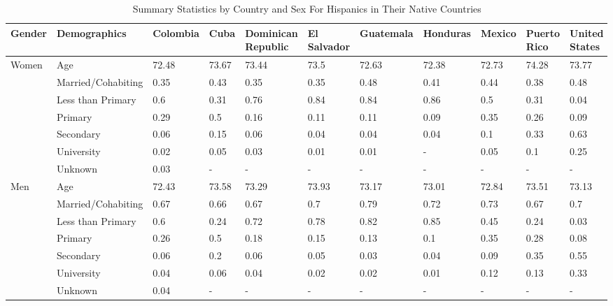 \documentclass[
]{article}
\begin{document}
\begin{landscape}
\begin{table}[ht]
\centering
\caption{Summary Statistics by Country and Sex For Hispanics in Their Native Countries} 

\begingroup\small
\begin{tabular}{l|l|lllllllll}
  \hline
Gender & Demographics & Colombia & Cuba & Dominican Republic & El Salvador & Guatemala & Honduras & Mexico & Puerto Rico & United States \\ 
  \hline
Women & Age & 72.48 & 73.67 & 73.44 & 73.5 & 72.63 & 72.38 & 72.73 & 74.28 & 73.77 \\ 
   & Married/Cohabiting & 0.35 & 0.43 & 0.35 & 0.35 & 0.48 & 0.41 & 0.44 & 0.38 & 0.48 \\ 
   & Less than Primary & 0.6 & 0.31 & 0.76 & 0.84 & 0.84 & 0.86 & 0.5 & 0.31 & 0.04 \\ 
   & Primary & 0.29 & 0.5 & 0.16 & 0.11 & 0.11 & 0.09 & 0.35 & 0.26 & 0.09 \\ 
   & Secondary & 0.06 & 0.15 & 0.06 & 0.04 & 0.04 & 0.04 & 0.1 & 0.33 & 0.63 \\ 
   & University & 0.02 & 0.05 & 0.03 & 0.01 & 0.01 & - & 0.05 & 0.1 & 0.25 \\ 
   & Unknown & 0.03 & - & - & - & - & - & - & - & - \\ 
  Men & Age & 72.43 & 73.58 & 73.29 & 73.93 & 73.17 & 73.01 & 72.84 & 73.51 & 73.13 \\ 
   & Married/Cohabiting & 0.67 & 0.66 & 0.67 & 0.7 & 0.79 & 0.72 & 0.73 & 0.67 & 0.7 \\ 
   & Less than Primary & 0.6 & 0.24 & 0.72 & 0.78 & 0.82 & 0.85 & 0.45 & 0.24 & 0.03 \\ 
   & Primary & 0.26 & 0.5 & 0.18 & 0.15 & 0.13 & 0.1 & 0.35 & 0.28 & 0.08 \\ 
   & Secondary & 0.06 & 0.2 & 0.06 & 0.05 & 0.03 & 0.04 & 0.09 & 0.35 & 0.55 \\ 
   & University & 0.04 & 0.06 & 0.04 & 0.02 & 0.02 & 0.01 & 0.12 & 0.13 & 0.33 \\ 
   & Unknown & 0.04 & - & - & - & - & - & - & - & - \\ 
   \hline
\end{tabular}
\endgroup
\end{table}




\end{landscape}
\end{document}
